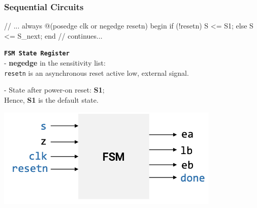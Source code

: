 \documentclass[12pt,openany]{book}
\begin{document}
\subsubsection{Sequential Circuits}
\begin{minipage}[htp]{0.45\textwidth}
\begin{vhdl}
// ...
always @(posedge clk or negedge resetn) begin
	if (!resetn) S <= S1;
	else S <= S_next;
	end
// continues...
\end{vhdl}
\end{minipage}
\hfill\vline
\hfill
\begin{minipage}[htp]{0.45\textwidth}
\begin{justify}
	\texttt{\textbf{FSM State Register }}\\
	- \textbf{negedge} in the sensitivity list: \\
	\texttt{resetn} is an asynchronous reset active low, external signal.

	- State after power-on reset: \textbf{S1}; \\
	Hence, \textbf{S1} is the default state.
	\begin{center}
		\includegraphics[width=0.8\textwidth]{circuits/18.4_3.png}
	\end{center}
\end{justify}
\end{minipage}
\newline
\end{document}
